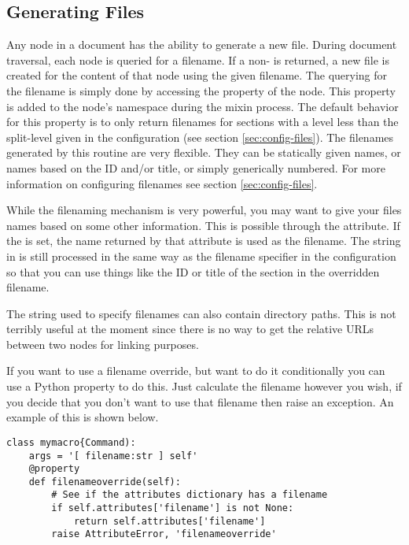 \subsection{Generating Files}

Any node in a document has the ability to generate a new file.
During document traversal, each node is queried for a filename.  If
a non- is returned, a new file is created for the content
of that node using the given filename.  The querying for the filename
is simply done by accessing the  property of the
node.  This property is added to the node's namespace during the
mixin process.  The default behavior for this property is to only
return filenames for sections with a level less than the split-level
given in the configuration (see section \ref{sec:config-files}).
The filenames generated by this routine are very flexible.  They can
be statically given names, or names based on the ID and/or title,
or simply generically numbered.  For more information on configuring
filenames see section \ref{sec:config-files}.

While the filenaming mechanism is very powerful, you may want to give
your files names based on some other information.  This is possible through
the  attribute.  If the 
is set, the name returned by that attribute is used as the filename.
The string in  is still processed in the same
way as the filename specifier in the configuration so that you can
use things like the ID or title of the section in the overridden filename.

The string used to specify filenames can also contain directory paths.
This is not terribly useful at the moment since there is no way to
get the relative URLs between two nodes for linking purposes.

If you want to use a filename override, but want to do it conditionally
you can use a Python property to do this.  Just calculate the filename
however you wish, if you decide that you don't want to use that filename
then raise an  exception.  An example of this
is shown below.
\begin{verbatim}
class mymacro{Command):
    args = '[ filename:str ] self'
    @property
    def filenameoverride(self):
        # See if the attributes dictionary has a filename
        if self.attributes['filename'] is not None:
            return self.attributes['filename']
        raise AttributeError, 'filenameoverride'
\end{verbatim}


